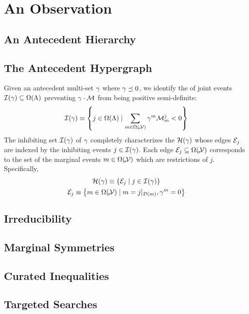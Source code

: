 \documentclass[aps, 10pt, english, twoside, twocolumn, pra, nofootinbib, tightenlines, longbibliography, superscriptaddress]{revtex4-1}
\begin{document}
    \section{An Observation}
    \subsection{An Antecedent Hierarchy}
    \subsection{The Antecedent Hypergraph}
    Given an antecedent multi-set $\gamma$ where $\gamma \preceq 0$, we identify the  of joint events $\inhibit{\multiset} \subseteq \events{\jointvar}$ preventing $\gamma \cdot \mathcal{M}$ from being positive semi-definite:
    \[ \inhibit{\multiset} \defined \bc{j \in \events{\jointvar} \mid \sum_{m \in \events{\mscenariowrap}} \multiset^{m} \incidence^{j}_{m} < 0} \]
    The inhibiting set $\inhibit{\multiset}$ of $\gamma$ completely characterizes the  $\hypergraph\br{\multiset}$ whose edges $\mathcal{E}_{j}$ are indexed by the inhibiting events $j \in \inhibit{\multiset}$. Each edge $\edges_{j} \subseteq \events{\mscenariowrap}$ corresponds to the set of the marginal events $m \in \events{\mscenariowrap}$ which are restrictions of $j$. Specifically,
    \begin{gather*}
        \hypergraph\br{\multiset} \defined \bc{\edges_j \mid j \in \inhibit{\multiset}} \\
        \edges_{j} \defined \bc{m \in \events{\mscenariowrap} \mid m = \restrict{j}{\domain{m}}, \multiset^{m} = 0}
    \end{gather*}

    \subsection{Irreducibility}
    \subsection{Marginal Symmetries}
    \label{sec:marginal_symmetries}
    \subsection{Curated Inequalities}
    \subsection{Targeted Searches}
\end{document}
